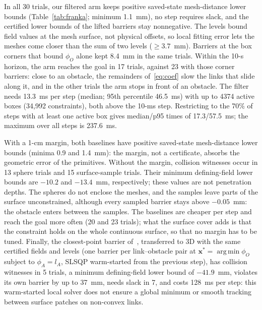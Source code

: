 \documentclass[journal]{IEEEtran}
\theoremstyle{definition}
\newcommand{\timeFrankaMed}{13.3}\newcommand{\timeFrankaPninetyfive}{46.5}
\DeclareMathOperator*{\argmin}{arg\,min}
\begin{document}
In all 30 trials, our filtered arm keeps positive saved-state mesh-distance lower bounds
(Table~\ref{tab:franka}; minimum 1.1~mm), no step requires slack, and the certified lower bounds of
the lifted barriers stay nonnegative. The levels bound field values at the mesh surface, not physical
offsets, so local fitting error lets the meshes come closer than the sum of two levels ($\ge3.7$~mm). Barriers at the box corners that
bound $\phi_O$ alone kept 8.4~mm in the same trials. Within the 10-s horizon, the arm reaches the goal in 17 trials, against
23 with those corner barriers: close to an obstacle, the remainders of~\eqref{eq:coef} slow the links
that slide along it, and in the other trials the arm stops in front of an obstacle. The filter needs
\timeFrankaMed~ms per step (median; 95th percentile \timeFrankaPninetyfive~ms) with up to 4374 active
boxes (34{,}992 constraints), both above the 10-ms step. Restricting to the 70\% of steps with at least one active box gives median/p95 times of
17.3/57.5~ms; the maximum over all steps is 237.6~ms.

With a 1-cm margin, both baselines have positive saved-state mesh-distance lower bounds
(minima 0.9 and 1.4~mm): the margin, not a certificate, absorbs the geometric error of the
primitives. Without the margin, collision witnesses occur in 13 sphere trials and 15 surface-sample
trials. Their minimum defining-field lower bounds are $-10.2$ and $-13.4$~mm, respectively;
these values are not penetration depths. The spheres do not enclose the meshes, and the samples
leave parts of the surface unconstrained,
although every sampled barrier stays above $-0.05$~mm: the obstacle enters between the samples. The baselines are
cheaper per step and reach the goal more often (20 and 23 trials); what the surface cover adds is
that the constraint holds on the whole continuous surface, so that no margin has to be tuned.
Finally, the closest-point barrier of~\cite{jo2026geometry}, transferred to 3D with the same
certified fields and levels (one barrier per link--obstacle pair at
$\mathbf x^\ast=\argmin\phi_O$ subject to $\phi_A=l_A$, SLSQP warm-started from the previous step),
has collision witnesses in 5 trials, a minimum defining-field lower bound of $-41.9$~mm,
violates its own barrier by up to 37~mm, needs slack in 7, and costs 128~ms per step:
this warm-started local solver does not ensure a global minimum or smooth tracking between
surface patches on non-convex links.
\end{document}
